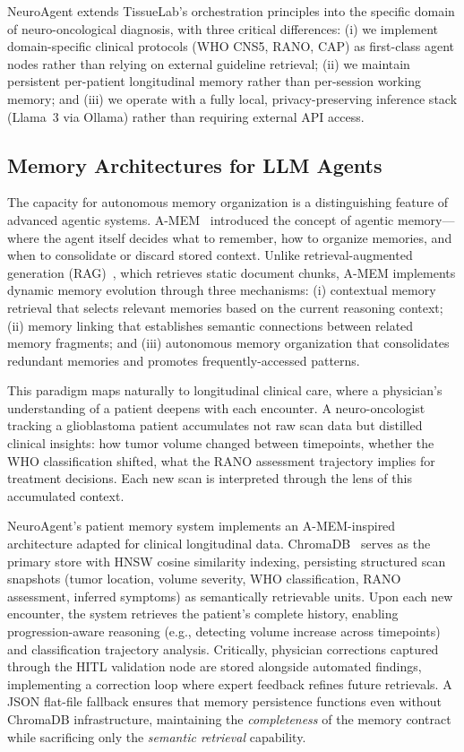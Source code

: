 NeuroAgent extends TissueLab's orchestration principles into the specific domain of neuro-oncological diagnosis, with three critical differences: (i) we implement domain-specific clinical protocols (WHO CNS5, RANO, CAP) as first-class agent nodes rather than relying on external guideline retrieval; (ii) we maintain persistent per-patient longitudinal memory rather than per-session working memory; and (iii) we operate with a fully local, privacy-preserving inference stack (Llama~3 via Ollama) rather than requiring external API access.

\subsection{Memory Architectures for LLM Agents}

The capacity for autonomous memory organization is a distinguishing feature of advanced agentic systems. A-MEM~\cite{amem2024} introduced the concept of agentic memory---where the agent itself decides what to remember, how to organize memories, and when to consolidate or discard stored context. Unlike retrieval-augmented generation (RAG)~\cite{lewis2020rag}, which retrieves static document chunks, A-MEM implements dynamic memory evolution through three mechanisms: (i) contextual memory retrieval that selects relevant memories based on the current reasoning context; (ii) memory linking that establishes semantic connections between related memory fragments; and (iii) autonomous memory organization that consolidates redundant memories and promotes frequently-accessed patterns.

This paradigm maps naturally to longitudinal clinical care, where a physician's understanding of a patient deepens with each encounter. A neuro-oncologist tracking a glioblastoma patient accumulates not raw scan data but distilled clinical insights: how tumor volume changed between timepoints, whether the WHO classification shifted, what the RANO assessment trajectory implies for treatment decisions. Each new scan is interpreted through the lens of this accumulated context.

NeuroAgent's patient memory system implements an A-MEM-inspired architecture adapted for clinical longitudinal data. ChromaDB~\cite{chromadb2024} serves as the primary store with HNSW cosine similarity indexing, persisting structured scan snapshots (tumor location, volume severity, WHO classification, RANO assessment, inferred symptoms) as semantically retrievable units. Upon each new encounter, the system retrieves the patient's complete history, enabling progression-aware reasoning (e.g., detecting volume increase across timepoints) and classification trajectory analysis. Critically, physician corrections captured through the HITL validation node are stored alongside automated findings, implementing a correction loop where expert feedback refines future retrievals. A JSON flat-file fallback ensures that memory persistence functions even without ChromaDB infrastructure, maintaining the \textit{completeness} of the memory contract while sacrificing only the \textit{semantic retrieval} capability.

